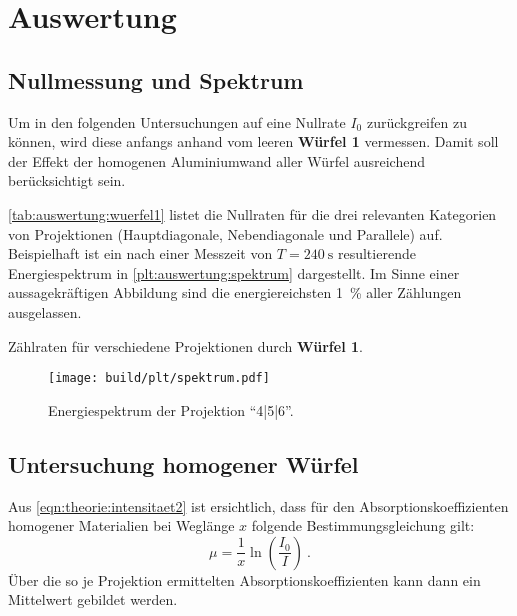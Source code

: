 \section{Auswertung}
\label{sec:auswertung}

\subsection{Nullmessung und Spektrum}

Um in den folgenden Untersuchungen auf eine Nullrate $I_0$ zurückgreifen zu können,
wird diese anfangs anhand vom leeren \textbf{Würfel 1} vermessen.
Damit soll der Effekt der homogenen Aluminiumwand aller Würfel ausreichend berücksichtigt sein.

\autoref{tab:auswertung:wuerfel1} listet die Nullraten für die drei relevanten Kategorien von Projektionen
(Hauptdiagonale, Nebendiagonale und Parallele)
auf.
Beispielhaft ist ein nach einer Messzeit von $T = \SI{240}{\second}$ resultierende Energiespektrum in \autoref{plt:auswertung:spektrum} dargestellt.
Im Sinne einer aussagekräftigen Abbildung sind die energiereichsten \SI{1}{\percent} aller Zählungen ausgelassen.

\begin{table}[H]
    \centering
    \caption{Zählraten für verschiedene Projektionen durch \textbf{Würfel 1}.}
    \label{tab:auswertung:wuerfel1}
\end{table}

\begin{figure}
    \centering
    \texttt{[image: build/plt/spektrum.pdf]}
    \caption{Energiespektrum der Projektion \enquote{4|5|6}.}
    \label{plt:auswertung:spektrum}
\end{figure}


\subsection{Untersuchung homogener Würfel}
Aus \autoref{eqn:theorie:intensitaet2} ist ersichtlich,
dass für den Absorptionskoeffizienten homogener Materialien bei Weglänge $x$ folgende Bestimmungsgleichung gilt:
\begin{equation*}
    \mu = \frac{1}{x} \ln \left( \frac{I_0}{I} \right) \ .
\end{equation*}
Über die so je Projektion ermittelten Absorptionskoeffizienten kann dann ein Mittelwert gebildet werden.


